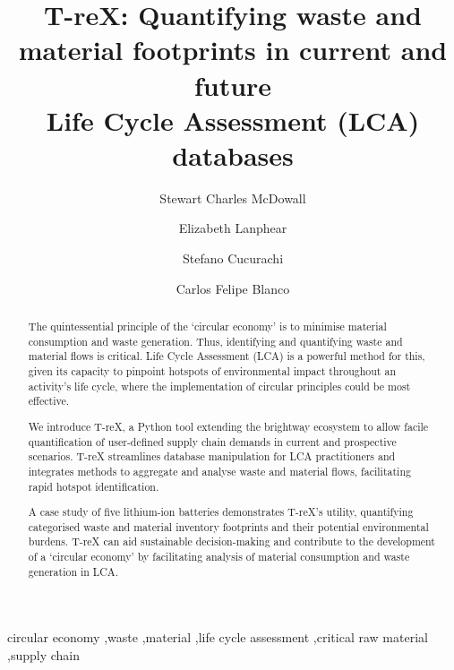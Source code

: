 \documentclass[review,3p,authoryear]{elsarticle}
\newcommand{\cbox}[1]{
    \begin{tcolorbox}[hbox, colback=red!5!white, colframe=red!65!black, boxrule=0.25pt, boxsep=2pt, left=2pt, right=2pt, top=1pt, bottom=1pt]
        \small\sffamily #1
    \end{tcolorbox}
    }
\begin{document}
\begin{frontmatter}

    \title{T-reX\@: Quantifying waste and material footprints in current and future \\ Life Cycle Assessment (LCA) databases}
    \author[1]{Stewart Charles McDowall}
    \author[1]{Elizabeth Lanphear}
    \author[1]{Stefano Cucurachi}
    \author[1]{Carlos Felipe Blanco}



    \begin{abstract}
        The quintessential principle of the `circular economy' is to minimise material consumption and waste generation. Thus, identifying and quantifying waste and material flows is critical. Life Cycle Assessment (LCA) is a powerful method for this, given its capacity to pinpoint hotspots of environmental impact throughout an activity's life cycle, where the implementation of circular principles could be most effective.

        We introduce T-reX, a Python tool extending the brightway ecosystem to allow facile quantification of user-defined supply chain demands in current and prospective scenarios. T-reX streamlines database manipulation for LCA practitioners and integrates methods to aggregate and analyse waste and material flows, facilitating rapid hotspot identification.

        A case study of five lithium-ion batteries demonstrates T-reX's utility, quantifying categorised waste and material inventory footprints and their potential environmental burdens. T-reX can aid sustainable decision-making and contribute to the development of a `circular economy' by facilitating analysis of material consumption and waste generation in LCA.


    \end{abstract}

    \begin{keyword}
        circular economy \sep{}waste \sep{}material \sep{}life cycle assessment \sep{}critical raw material \sep{}supply chain
    \end{keyword}

\end{frontmatter}
\end{document}
